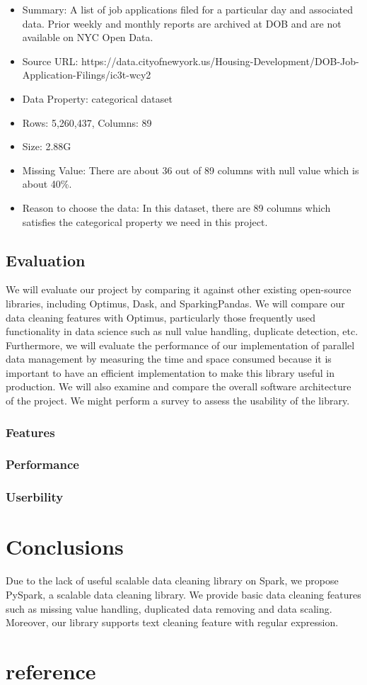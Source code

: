 \documentclass[sigconf]{acmart}
\begin{document}
\begin{itemize}
	\item{Summary: A list of job applications filed for a particular day and associated data. Prior weekly and monthly reports are archived at DOB and are not available on NYC Open Data.}
	\item{Source URL: https://data.cityofnewyork.us/Housing-Development/DOB-Job-Application-Filings/ic3t-wcy2}
	\item{Data Property: categorical dataset}
	\item{Rows: 5,260,437, Columns: 89}
	\item{Size: 2.88G}
	\item{Missing Value: There are about 36 out of 89 columns with null value which is about 40\%.}
	\item{Reason to choose the data: In this dataset, there are 89 columns which satisfies the categorical property we need in this project.}
\end{itemize}
\subsection{Evaluation}
We will evaluate our project by comparing it against other existing open-source libraries, including Optimus\cite{optimus}, Dask\cite{dask}, and SparkingPandas\cite{sparklingpandas}. We will compare our data cleaning features with Optimus, particularly those frequently used functionality in data science such as null value handling, duplicate detection, etc. Furthermore, we will evaluate the performance of our implementation of parallel data management by measuring the time and space consumed because it is important to have an efficient implementation to make this library useful in production. We will also examine and compare the overall software architecture of the project. We might perform a survey to assess the usability of the library.
\subsubsection{Features}
\subsubsection{Performance}
\subsubsection{Userbility}

\section{Conclusions}
Due to the lack of useful scalable data cleaning library on Spark, we propose PySpark, a scalable data cleaning library. We provide basic data cleaning features such as missing value handling, duplicated data removing and data scaling. Moreover, our library supports text cleaning feature with regular expression.

\section{reference}


\end{document}
